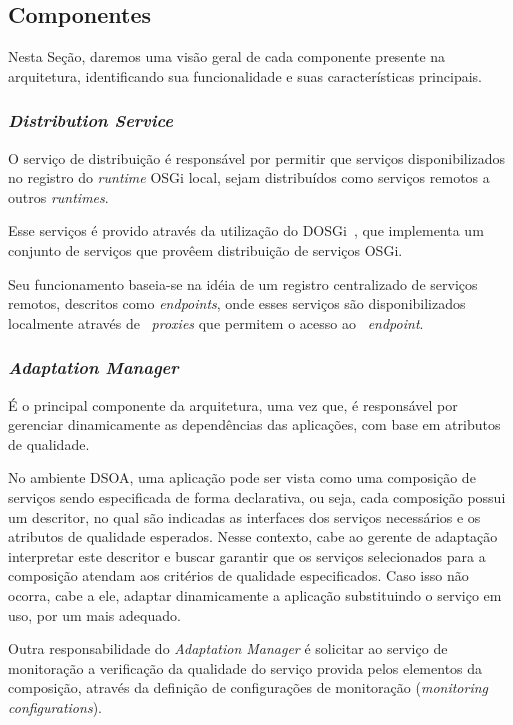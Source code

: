 \subsection{Componentes}
Nesta Seção, daremos uma visão geral de cada componente presente na arquitetura, identificando sua funcionalidade e suas características principais.

\subsubsection{\textit{Distribution Service}}
O serviço de distribuição é responsável por permitir que serviços disponibilizados no registro do \textit{runtime} OSGi local, sejam distribuídos como serviços remotos a outros \textit{runtimes}.

Esse serviços é provido através da utilização do DOSGi~\cite{dosgi}, que implementa um conjunto de serviços que provêem distribuição de serviços OSGi. 

Seu funcionamento baseia-se na idéia de um registro centralizado de serviços remotos, descritos como \textit{endpoints}, onde esses serviços são disponibilizados localmente através de ~\textit{proxies} que permitem o acesso ao ~\textit{endpoint}.

\subsubsection{\textit{Adaptation Manager}}

É o principal componente da arquitetura, uma vez que, é responsável por gerenciar dinamicamente as dependências das aplicações, com base em atributos de qualidade. 

No ambiente DSOA, uma aplicação pode ser vista como uma composição de serviços sendo especificada de forma declarativa, ou seja, cada composição possui um descritor, no qual são indicadas as interfaces dos serviços necessários e os atributos de qualidade esperados. Nesse contexto, cabe ao gerente de adaptação interpretar este descritor e buscar garantir que os serviços selecionados para a composição atendam aos critérios de qualidade especificados. Caso isso não ocorra, cabe a ele, adaptar dinamicamente a aplicação substituindo o serviço em uso, por um mais adequado.

Outra responsabilidade do \textit{Adaptation Manager} é solicitar ao serviço de monitoração a verificação da qualidade do serviço provida pelos elementos da composição, através da definição de configurações de monitoração (\textit{monitoring configurations}).

